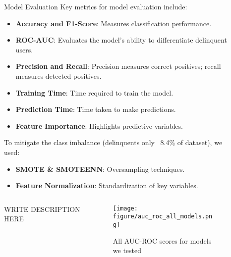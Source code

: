 \documentclass[final]{beamer}
\newlength{\sepwidth}
\newlength{\colwidth}
\newcommand{\separatorcolumn}{\begin{column}{\sepwidth}\end{column}}
\begin{document}
\begin{frame}[t]
\begin{columns}[t]
\begin{column}{\colwidth}
\begin{block}{Model Evaluation}
    Key metrics for model evaluation include:
    \begin{itemize}
        \item \textbf{Accuracy and F1-Score}: Measures classification performance.
        \item \textbf{ROC-AUC}: Evaluates the model's ability to differentiate delinquent users.
        \item \textbf{Precision and Recall}: Precision measures correct positives; recall measures detected positives.
        \item \textbf{Training Time}: Time required to train the model.
        \item \textbf{Prediction Time}: Time taken to make predictions.
        \item \textbf{Feature Importance}: Highlights predictive variables.
    \end{itemize}
    To mitigate the class imbalance (delinquents only ~8.4\% of dataset), we used:
    \begin{itemize}
        \item \textbf{SMOTE \& SMOTEENN}: Oversampling techniques.
        \item \textbf{Feature Normalization}: Standardization of key variables.
    \end{itemize}

\vspace{1em}

\begin{columns}
\begin{column}{0.5\textwidth}  %
\justify
WRITE DESCRIPTION HERE

\end{column}
\begin{column}{0.5\textwidth}
\begin{center}
      \begin{figure}[H]
        \texttt{[image: figure/auc\_roc\_all\_models.png]}
        \caption{All AUC-ROC scores for models we tested}
        \label{fig:accounts_df}
    \end{figure}
\end{center}
\end{column}
\end{columns}
  \end{block}
\end{column}

\separatorcolumn

\begin{column}{\colwidth}


\end{column}
\end{columns}
\end{frame}
\end{document}
